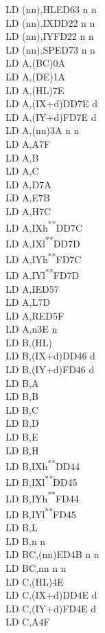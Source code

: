 \documentclass[12pt,twoside,openright,a4paper]{book}
\newcommand{\UNDOC}{\textnormal{\textsuperscript{**}}}
\begin{document}
\begin{multicols}{3}
{\begin{tabbing}
	LD (nn),HL\>ED63 n n\\
	LD (nn),IX\>DD22 n n\\
	LD (nn),IY\>FD22 n n\\
	LD (nn),SP\>ED73 n n\\
	LD A,(BC)\>0A\\
	LD A,(DE)\>1A\\
	LD A,(HL)\>7E\\
	LD A,(IX+d)\>DD7E d\\
	LD A,(IY+d)\>FD7E d\\
	LD A,(nn)\>3A n n\\
	LD A,A\>7F\\
	LD A,B\\
	LD A,C\\
	LD A,D\>7A\\
	LD A,E\>7B\\
	LD A,H\>7C\\
	LD A,IXh\UNDOC\>DD7C\\
	LD A,IXl\UNDOC\>DD7D\\
	LD A,IYh\UNDOC\>FD7C\\
	LD A,IYl\UNDOC\>FD7D\\
	LD A,I\>ED57\\
	LD A,L\>7D\\
	LD A,R\>ED5F\\
	LD A,n\>3E n\\
	LD B,(HL)\\
	LD B,(IX+d)\>DD46 d\\
	LD B,(IY+d)\>FD46 d\\
	LD B,A\\
	LD B,B\\
	LD B,C\\
	LD B,D\\
	LD B,E\\
	LD B,H\\
	LD B,IXh\UNDOC\>DD44\\
	LD B,IXl\UNDOC\>DD45\\
	LD B,IYh\UNDOC\>FD44\\
	LD B,IYl\UNDOC\>FD45\\
	LD B,L\\
	LD B,n n\\
	LD BC,(nn)\>ED4B n n\\
	LD BC,nn n n\\
	LD C,(HL)\>4E\\
	LD C,(IX+d)\>DD4E d\\
	LD C,(IY+d)\>FD4E d\\
	LD C,A\>4F\\

\end{tabbing}}
\end{multicols}
\end{document}
